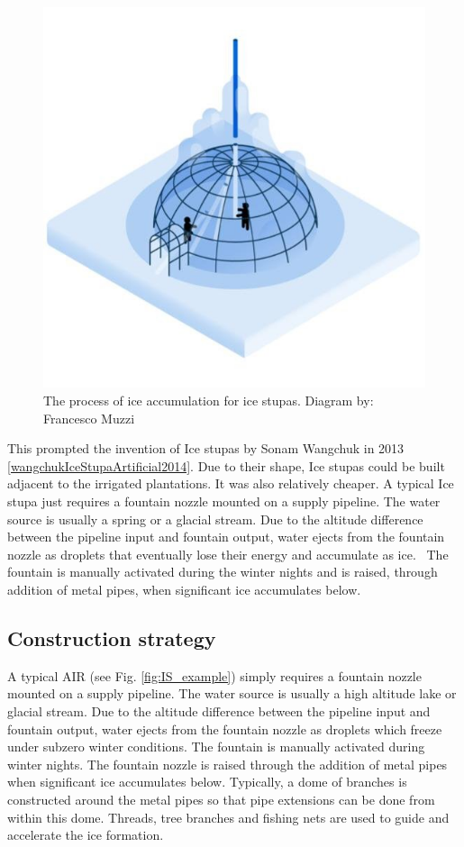 \begin{figure}[t]
\centering
\includegraphics[width=12cm]{figs/IS_science.jpg}

\caption{ The process of ice accumulation for ice stupas. Diagram by: Francesco Muzzi }

\label{fig:ISscience}
\end{figure}

This prompted the invention of Ice stupas by Sonam Wangchuk in 2013 \ref{wangchukIceStupaArtificial2014}. Due to
their shape, Ice stupas could be built adjacent to the irrigated plantations. It was also relatively cheaper. A
typical Ice stupa just requires a fountain nozzle mounted on a supply pipeline. The water source is usually a
spring or a glacial stream. Due to the altitude difference between the pipeline input and fountain output, water
ejects from the fountain nozzle as droplets that eventually lose their energy and accumulate as ice.  The
fountain is manually activated during the winter nights and is raised, through addition of metal pipes, when
significant ice accumulates below.

\subsection{Construction strategy}

A typical AIR (see Fig. \ref{fig:IS_example}) simply requires a fountain nozzle mounted on a supply pipeline.
The water source is usually a high altitude lake or glacial stream. Due to the altitude difference between the
pipeline input and fountain output, water ejects from the fountain nozzle as droplets which freeze under subzero
winter conditions. The fountain is manually activated during winter nights. The fountain nozzle is raised
through the addition of metal pipes when significant ice accumulates below.  Typically, a dome of branches is
constructed around the metal pipes so that pipe extensions can be done from within this dome. Threads, tree
branches and fishing nets are used to guide and accelerate the ice formation.

